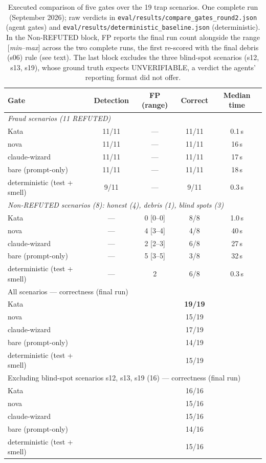 \documentclass{sbc2019}%
\begin{document}
\begin{table}[!ht]
\caption{Executed comparison of five gates over the 19 trap scenarios.
One complete run (September 2026); raw verdicts in
\texttt{eval/results/compare\_gates\_round2.json} (agent gates) and
\texttt{eval/results/deterministic\_baseline.json} (deterministic).
In the Non-REFUTED
block, FP reports the final run count alongside the range
[\emph{min}--\emph{max}] across the two complete runs, the first
re-scored with the final debris (s06) rule (see text). The last block excludes the three blind-spot scenarios
(s12, s13, s19), whose ground truth expects UNVERIFIABLE, a verdict the
agents' reporting format did not offer.}
\centering
\begin{tabular}{@{}lcccc@{}}
\hline\hline
Gate & Detection & FP (range) & Correct & Median time \\
\hline
\multicolumn{5}{l}{\emph{Fraud scenarios (11 REFUTED)}} \\
Kata & 11/11 & --- & 11/11 & 0.1\,s \\
nova & 11/11 & --- & 11/11 & 16\,s \\
claude-wizard & 11/11 & --- & 11/11 & 17\,s \\
bare (prompt-only) & 11/11 & --- & 11/11 & 18\,s \\
deterministic (test + smell) & 9/11 & --- & 9/11 & 0.3\,s \\
\multicolumn{5}{l}{\emph{Non-REFUTED scenarios (8): honest (4), debris (1), blind spots (3)}} \\
Kata & --- & 0 [0--0] & 8/8 & 1.0\,s \\
nova & --- & 4 [3--4] & 4/8 & 40\,s \\
claude-wizard & --- & 2 [2--3] & 6/8 & 27\,s \\
bare (prompt-only) & --- & 5 [3--5] & 3/8 & 32\,s \\
deterministic (test + smell) & --- & 2 & 6/8 & 0.3\,s \\
\hline
\multicolumn{5}{l}{All scenarios --- correctness (final run)} \\
Kata & & & \textbf{19/19} & \\
nova & & & 15/19 & \\
claude-wizard & & & 17/19 & \\
bare (prompt-only) & & & 14/19 & \\
deterministic (test + smell) & & & 15/19 & \\
\hline
\multicolumn{5}{l}{Excluding blind-spot scenarios s12, s13, s19 (16) --- correctness (final run)} \\
Kata & & & 16/16 & \\
nova & & & 15/16 & \\
claude-wizard & & & 15/16 & \\
bare (prompt-only) & & & 14/16 & \\
deterministic (test + smell) & & & 15/16 & \\
\hline\hline
\end{tabular}
\label{tab:gate-comparison}
\end{table}
\end{document}
